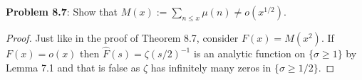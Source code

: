 \documentclass[12pt]{article}
\newcommand{\Fhat}{\widehat{F}}
\begin{document}
\textbf{Problem 8.7}: Show that $M(x) := \sum_{n \leq x} \mu(n) \not= o(x^{1/2})$.

\begin{proof}
Just like in the proof of Theorem 8.7, consider $F(x) = M(x^2)$. If $F(x) = o(x)$ then $\Fhat(s) = \zeta(s/2)^{-1}$ is an analytic function on $\{\sigma \geq 1\}$ by Lemma 7.1 and that is false as $\zeta$ has infinitely many zeros in $\{\sigma \geq 1/2\}$.
\end{proof}

\unless\ifdefined\IsMainDocument
\end{document}
